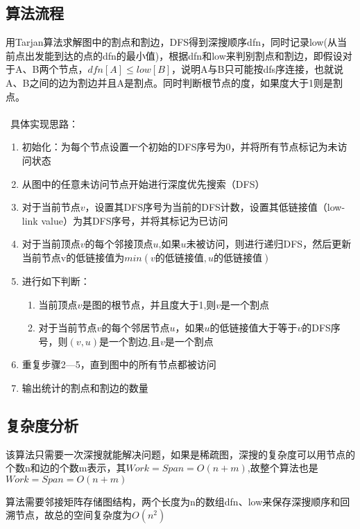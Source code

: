 \documentclass[UTF8,a4paperdui, %
]{ctexart}
\begin{document}
\subsection{算法流程}
用Tarjan算法求解图中的割点和割边，DFS得到深搜顺序dfn，同时记录low(从当前点出发能到达的点的dfn的最小值)，根据dfn和low来判别割点和割边，即假设对于A、B两个节点，$dfn[A] \leq low[B]$，说明A与B只可能按dfs序连接，也就说A、B之间的边为割边并且A是割点。同时判断根节点的度，如果度大于1则是割点。\\
\\\
具体实现思路：
\begin{enumerate}
    \item 初始化：为每个节点设置一个初始的DFS序号为0，并将所有节点标记为未访问状态
    \item 从图中的任意未访问节点开始进行深度优先搜索（DFS）
    \item 对于当前节点$v$，设置其DFS序号为当前的DFS计数，设置其低链接值（low-link value）为其DFS序号，并将其标记为已访问
    \item 对于当前顶点$v$的每个邻接顶点$u$,如果$u$未被访问，则进行递归DFS，然后更新当前节点v的低链接值为$min(v\text{的低链接值}, u\text{的低链接值})$
    \item 进行如下判断：\begin{enumerate}
        \item 当前顶点$v$是图的根节点，并且度大于1,则$v$是一个割点
        \item 对于当前节点$v$的每个邻居节点$u$，如果$u$的低链接值大于等于$v$的DFS序号，则$(v, u)$是一个割边,且$v$是一个割点
    \end{enumerate}
    \item 重复步骤2—5，直到图中的所有节点都被访问
    \item 输出统计的割点和割边的数量
\end{enumerate}

\subsection{复杂度分析}
该算法只需要一次深搜就能解决问题，如果是稀疏图，深搜的复杂度可以用节点的个数n和边的个数m表示，其$Work=Span=O(n+m)$,故整个算法也是$Work=Span=O(n+m)$\par
算法需要邻接矩阵存储图结构，两个长度为n的数组dfn、low来保存深搜顺序和回溯节点，故总的空间复杂度为$O(n^2)$
\end{document}
